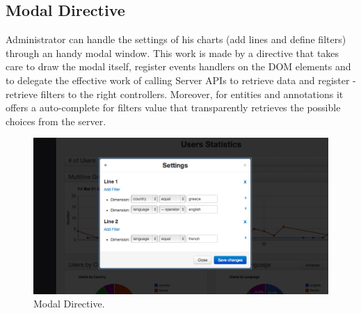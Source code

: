 \documentclass[a4paper,13pt]{report}
\begin{document}
\subsection{Modal Directive} %
Administrator can handle the settings of his charts (add lines and define filters) through an handy modal window.
This work is made by a directive that takes care to draw the modal itself, register events handlers on the DOM elements and to delegate the effective work of calling Server APIs to retrieve data and register - retrieve filters to the right controllers. Moreover, for entities and annotations it offers a auto-complete for filters value that transparently retrieves the possible choices from the server.
\label{sub:modal_directive}
\begin{figure}[H]
  \caption{Modal Directive.}
  \centering
    \includegraphics[width=1\textwidth]{pics/proto/modalOptions}
\end{figure}
\end{document}

